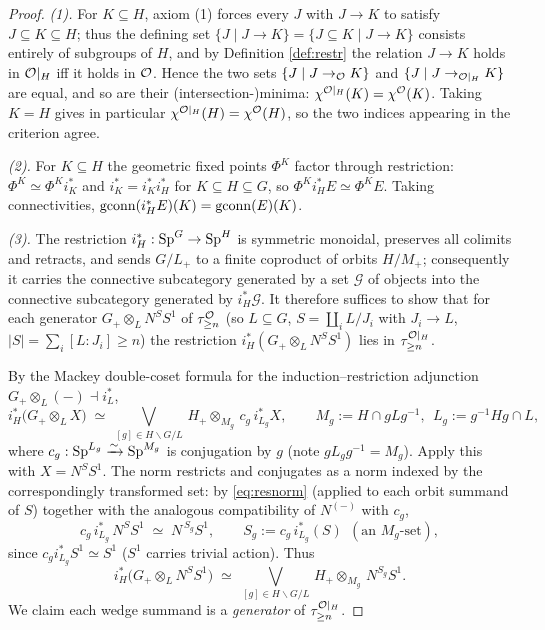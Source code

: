 \begin{proof}
\emph{(1).} For $K\subseteq H$, axiom (1) forces every $J$ with $J\to K$ to satisfy
$J\subseteq K\subseteq H$; thus the defining set
$\{J\mid J\to K\}=\{J\subseteq K\mid J\to K\}$ consists entirely of subgroups of $H$,
and by Definition \ref{def:restr} the relation $J\to K$ holds in $\mathcal{O}|_H$ iff it
holds in $\mathcal{O}$. Hence the two sets $\{J\mid J\to_{\mathcal{O}}K\}$ and
$\{J\mid J\to_{\mathcal{O}|_H}K\}$ are equal, and so are their (intersection-)minima:
$\chi^{\mathcal{O}|_H}(K)=\chi^{\mathcal{O}}(K)$. Taking $K=H$ gives in particular
$\chi^{\mathcal{O}|_H}(H)=\chi^{\mathcal{O}}(H)$, so the two indices appearing in the criterion
agree.

\emph{(2).} For $K\subseteq H$ the geometric fixed points $\Phi^K$ factor through
restriction: $\Phi^K\simeq\Phi^K i_K^\ast$ and $i_K^\ast=i_K^\ast i_H^\ast$ for
$K\subseteq H\subseteq G$, so $\Phi^K i_H^\ast E\simeq\Phi^K E$. Taking connectivities,
$\operatorname{gconn}(i_H^\ast E)(K)=\operatorname{gconn}(E)(K)$.

\emph{(3).} The restriction $i_H^\ast:\mathrm{Sp}^G\to\mathrm{Sp}^H$ is symmetric monoidal,
preserves all colimits and retracts, and sends $G/L_+$ to a finite coproduct of
orbits $H/M_+$; consequently it carries the connective subcategory generated by a
set $\mathcal G$ of objects into the connective subcategory generated by
$i_H^\ast\mathcal G$. It therefore suffices to show that for each generator
$G_+\otimes_L N^S S^1$ of $\tau^{\mathcal{O}}_{\ge n}$ (so $L\subseteq G$,
$S=\coprod_i L/J_i$ with $J_i\to L$, $|S|=\sum_i[L:J_i]\ge n$) the restriction
$i_H^\ast(G_+\otimes_L N^S S^1)$ lies in $\tau^{\mathcal{O}|_H}_{\ge n}$.

By the Mackey double-coset formula for the induction--restriction adjunction
$G_+\otimes_L(-)\dashv i_L^\ast$,
\[
i_H^\ast\bigl(G_+\otimes_L X\bigr)\;\simeq\;
\bigvee_{[g]\in H\backslash G/L}\,
   H_+\otimes_{M_g}\, c_g\, i_{L_g}^\ast X ,
\qquad
M_g:=H\cap gLg^{-1},\ \ L_g:=g^{-1}Hg\cap L ,
\]
where $c_g:\mathrm{Sp}^{L_g}\xrightarrow{\sim}\mathrm{Sp}^{M_g}$ is conjugation by $g$
(note $gL_gg^{-1}=M_g$). Apply this with $X=N^S S^1$. The norm restricts and
conjugates as a norm indexed by the correspondingly transformed set: by
\eqref{eq:resnorm} (applied to each orbit summand of $S$) together with the
analogous compatibility of $N^{(-)}$ with $c_g$,
\[
c_g\, i_{L_g}^\ast\,N^S S^1\;\simeq\; N^{\,S_g} S^1,\qquad
S_g:=c_g\, i_{L_g}^\ast(S)\ \ (\text{an }M_g\text{-set}),
\]
since $c_g i_{L_g}^\ast S^1\simeq S^1$ ($S^1$ carries trivial action). Thus
\[
i_H^\ast\bigl(G_+\otimes_L N^S S^1\bigr)\;\simeq\;
\bigvee_{[g]\in H\backslash G/L}\, H_+\otimes_{M_g}\,N^{S_g}S^1 .
\]
We claim each wedge summand is a \emph{generator} of $\tau^{\mathcal{O}|_H}_{\ge n}$.


\end{proof}

